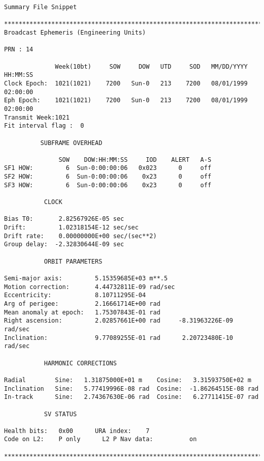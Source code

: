 \begin{\outputsize}
\begin{verbatim}
Summary File Snippet

****************************************************************************
Broadcast Ephemeris (Engineering Units)

PRN : 14

              Week(10bt)     SOW     DOW   UTD     SOD   MM/DD/YYYY   HH:MM:SS
Clock Epoch:  1021(1021)    7200   Sun-0   213    7200   08/01/1999   02:00:00
Eph Epoch:    1021(1021)    7200   Sun-0   213    7200   08/01/1999   02:00:00
Transmit Week:1021
Fit interval flag :  0

          SUBFRAME OVERHEAD

               SOW    DOW:HH:MM:SS     IOD    ALERT   A-S
SF1 HOW:         6  Sun-0:00:00:06   0x023      0     off
SF2 HOW:         6  Sun-0:00:00:06    0x23      0     off
SF3 HOW:         6  Sun-0:00:00:06    0x23      0     off

           CLOCK

Bias T0:       2.82567926E-05 sec
Drift:         1.02318154E-12 sec/sec
Drift rate:    0.00000000E+00 sec/(sec**2)
Group delay:  -2.32830644E-09 sec

           ORBIT PARAMETERS

Semi-major axis:         5.15359685E+03 m**.5
Motion correction:       4.44732811E-09 rad/sec
Eccentricity:            8.10711295E-04
Arg of perigee:          2.16661714E+00 rad
Mean anomaly at epoch:   1.75307843E-01 rad
Right ascension:         2.02857661E+00 rad     -8.31963226E-09 rad/sec
Inclination:             9.77089255E-01 rad      2.20723480E-10 rad/sec

           HARMONIC CORRECTIONS

Radial        Sine:   1.31875000E+01 m    Cosine:   3.31593750E+02 m
Inclination   Sine:   5.77419996E-08 rad  Cosine:  -1.86264515E-08 rad
In-track      Sine:   2.74367630E-06 rad  Cosine:   6.27711415E-07 rad

           SV STATUS

Health bits:   0x00      URA index:    7
Code on L2:    P only      L2 P Nav data:          on

****************************************************************************
\end{verbatim}
\end{\outputsize}

%
